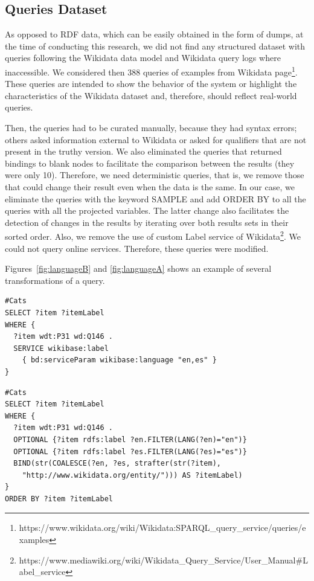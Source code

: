 \documentclass[runningheads]{llncs}
\begin{document}
\subsection{Queries Dataset}

As opposed to RDF data, which can be easily obtained in the form of dumps, at the time of conducting this research, we did not find any structured dataset with queries following the Wikidata data model and Wikidata query logs where inaccessible. We considered then 388 queries of examples from Wikidata page\footnote{https://www.wikidata.org/wiki/Wikidata:SPARQL\_query\_service/queries/examples}. These queries are intended to show the behavior of the system or highlight the characteristics of the Wikidata dataset and, therefore, should reflect real-world queries.

Then, the queries had to be curated manually, because they had syntax errors; others asked information external to Wikidata or asked for qualifiers that are not present in the truthy version. We also eliminated the queries that returned bindings to blank nodes to facilitate the comparison between the results (they were only 10). Therefore, we need deterministic queries, that is, we remove those that could change their result even when the data is the same. In our case, we eliminate the queries with the keyword SAMPLE and add ORDER BY to all the queries with all the projected variables. The latter change also facilitates the detection of changes in the results by iterating over both results sets in their sorted order. Also, we remove the use of custom Label service of Wikidata\footnote{https://www.mediawiki.org/wiki/Wikidata\_Query\_Service/User\_Manual\#Label\_service}. We could not query online services. Therefore, these queries were modified. 

Figures~\ref{fig:languageB} and \ref{fig:languageA} shows an example of several transformations of a query.

\begin{lstlisting}[captionpos=b, caption=Query transformation. Before., label=fig:languageB,
basicstyle=\ttfamily,frame=single]
#Cats
SELECT ?item ?itemLabel
WHERE {
  ?item wdt:P31 wd:Q146 .
  SERVICE wikibase:label
    { bd:serviceParam wikibase:language "en,es" }
}
\end{lstlisting}

\begin{lstlisting}[captionpos=b, caption=Query transformation. After., label=fig:languageA,
basicstyle=\ttfamily,frame=single]
#Cats
SELECT ?item ?itemLabel
WHERE {
  ?item wdt:P31 wd:Q146 .
  OPTIONAL {?item rdfs:label ?en.FILTER(LANG(?en)="en")}
  OPTIONAL {?item rdfs:label ?es.FILTER(LANG(?es)="es")}
  BIND(str(COALESCE(?en, ?es, strafter(str(?item),
    "http://www.wikidata.org/entity/"))) AS ?itemLabel)
}
ORDER BY ?item ?itemLabel
\end{lstlisting}
\end{document}
